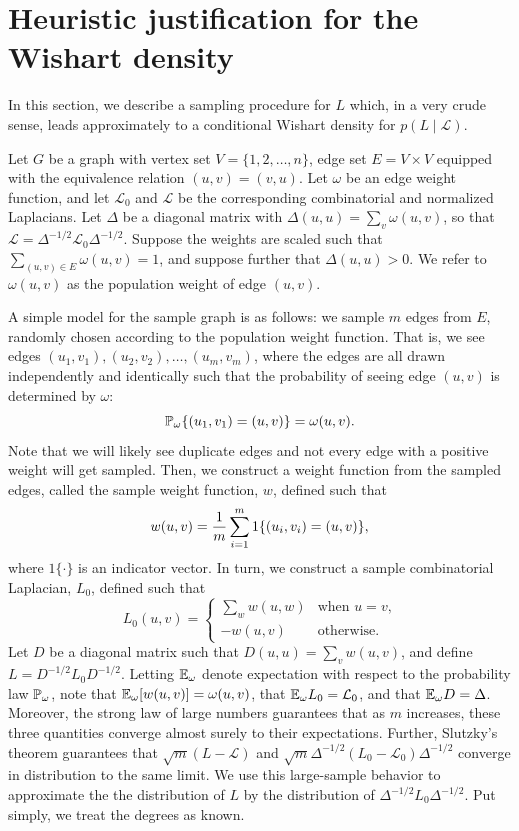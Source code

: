 \vspace{-2mm}
\section{Heuristic justification for the Wishart density}
\label{sxn:justification}
\vspace{-2mm}

In this section, we describe a sampling procedure for $L$ which, in a very 
crude sense, leads approximately to a conditional Wishart density for 
$p(L \mid \mathcal{L})$.

Let $G$ be a graph with vertex set $V = \{ 1, 2, \dotsc, n \}$, edge set 
$E = V \times V$ equipped with the equivalence relation $(u,v) = (v,u)$.  
Let $\omega$ be an edge weight function, and let $\mathcal{L}_0$ and 
$\mathcal{L}$ be the corresponding combinatorial and normalized Laplacians.  
Let $\Delta$ be a diagonal matrix with
$\Delta(u,u) = \sum_{v} \omega(u,v)$, so that
$\mathcal{L} = \Delta^{-1/2} \mathcal{L}_0 \Delta^{-1/2}$.  Suppose
the weights are scaled such that $\sum_{(u,v) \in E} \omega(u,v) = 1$,
and suppose further that $\Delta(u,u) > 0$.
We refer to $\omega(u,v)$ as the population weight of edge $(u,v)$.

A simple model for the sample graph is as follows: we sample $m$ edges
from $E$, randomly chosen according to the population weight function.
That is, we see edges $(u_1, v_1), (u_2, v_2), \dotsc, (u_m, v_m)$,
where the edges are all drawn independently and identically such that
the probability of seeing edge $(u,v)$ is determined by $\omega$:
\[
  \mathbb{P}_\omega\{ (u_1, v_1) = (u,v) \} = \omega(u,v).
\]
Note that we will likely see duplicate edges and not every edge with a
positive weight will get sampled.
Then, we construct a weight function from the sampled edges, called the
sample weight function, $w$, defined such that
\vspace{-2mm}
\[
  w(u,v) = \frac{1}{m} \sum_{i=1}^{m} 1\{ (u_i, v_i) = (u,v) \} ,
\vspace{-2mm}
\]
where $1\{\cdot\}$ is an indicator vector.
In turn, we construct a sample combinatorial Laplacian, $L_0$, defined such 
that
\[
  L_0(u,v)
    =
    \begin{cases}
      \sum_{w} w(u,w) &\text{when $u = v$,} \\
      -w(u,v) &\text{otherwise.}
    \end{cases}
\]
Let $D$ be a diagonal matrix such that
$D(u,u) = \sum_{v} w(u,v)$, and define $L = D^{-1/2} L_0 D^{-1/2}$.
Letting $\mathbb{E}_\omega$ denote expectation with respect to the probability
law $\mathbb{P}_\omega$, note that $\mathbb{E}_\omega[w(u,v)] = \omega(u,v)$,
that $\mathbb{E}_\omega L_0 = \mathcal{L}_0$, and that $\mathbb{E}_\omega D = \Delta$.
Moreover, the strong law of large numbers guarantees that as $m$ increases,
these three quantities converge almost surely to their expectations.
Further, Slutzky's theorem guarantees that $\sqrt{m} (L - \mathcal{L})$ and
$\sqrt{m} \Delta^{-1/2} (L_0 - \mathcal{L}_0) \Delta^{-1/2}$ converge in
distribution to the same limit.  
We use this large-sample behavior to
approximate the the distribution of $L$ by the distribution of
$\Delta^{-1/2} L_0 \Delta^{-1/2}$.  Put simply, we treat the degrees as known.

